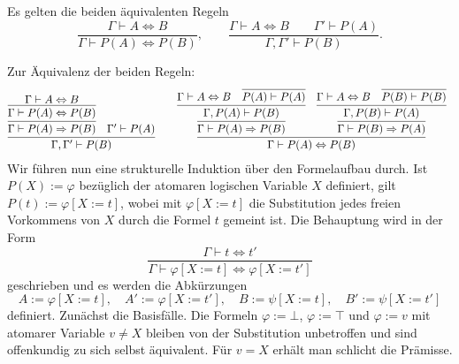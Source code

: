 \newpage
\begin{Satz}[Ersetzungsregel] Es gelten die beiden äquivalenten Regeln
\[\dfrac{\Gamma\vdash A\Leftrightarrow B}{\Gamma\vdash P(A)\Leftrightarrow P(B)},
\qquad\dfrac{\Gamma\vdash A\Leftrightarrow B\qquad\Gamma'\vdash P(A)}{\Gamma,\Gamma'\vdash P(B)}.
\]
\end{Satz}
\begin{Beweis}
Zur Äquivalenz der beiden Regeln:
\[
\begin{array}{@{}l@{\qquad}l}
\infer{\Gamma,\Gamma'\vdash P(B)}{
  \infer{\Gamma\vdash P(A)\Rightarrow P(B)}{
    \infer{\Gamma\vdash P(A)\Leftrightarrow P(B)}{
      \Gamma\vdash A\Leftrightarrow B}}
& \Gamma'\vdash P(A)}
&
\infer{\Gamma\vdash P(A)\Leftrightarrow P(B)}{
  \infer{\Gamma\vdash P(A)\Rightarrow P(B)}{
    \infer{\Gamma, P(A)\vdash P(B)}{
      \Gamma\vdash A\Leftrightarrow B
    & \infer{P(A)\vdash P(A)}{}}}
& \infer{\Gamma\vdash P(B)\Rightarrow P(A)}{
    \infer{\Gamma, P(B)\vdash P(A)}{
      \Gamma\vdash A\Leftrightarrow B
    & \infer{P(B)\vdash P(B)}{}}}}
\end{array}
\]
Wir führen nun eine strukturelle Induktion über den Formelaufbau durch.
Ist $P(X):=\varphi$ bezüglich der atomaren logischen Variable $X$
definiert, gilt $P(t):=\varphi[X{:=}t]$, wobei mit $\varphi[X{:=}t]$
die Substitution jedes freien Vorkommens von $X$ durch die Formel $t$
gemeint ist. Die Behauptung wird in der Form
\[\dfrac{\Gamma\vdash t\Leftrightarrow t'}{
\Gamma\vdash\varphi[X{:=}t]\Leftrightarrow\varphi[X{:=}t']}\]
geschrieben und es werden die Abkürzungen
\[A:=\varphi[X{:=}t],\quad A':=\varphi[X{:=}t'],\quad B:=\psi[X{:=}t],
\quad B':=\psi[X{:=}t']\]
definiert. Zunächst die Basisfälle. Die Formeln $\varphi:=\bot$,
$\varphi:=\top$ und $\varphi:=v$ mit atomarer Variable $v\ne X$
bleiben von der Substitution unbetroffen und sind offenkundig zu sich
selbst äquivalent. Für $v=X$ erhält man schlicht die Prämisse.


\end{Beweis}
